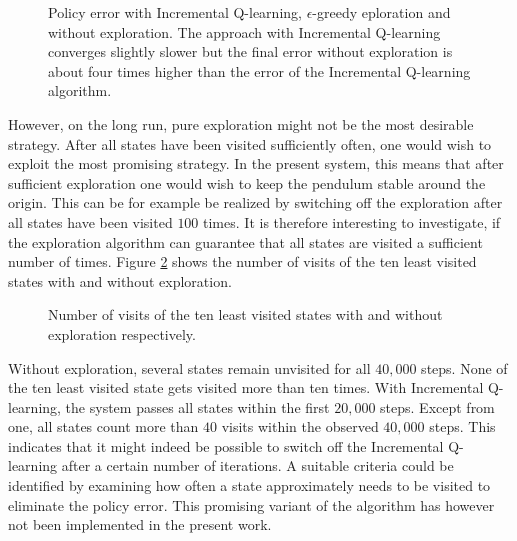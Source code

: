 \documentclass[../main.tex]{subfiles}
\begin{document}
\begin{figure}[h]
    \centering
    \caption{Policy error with Incremental Q-learning, $\epsilon$-greedy eploration and without exploration. The approach with Incremental Q-learning converges slightly slower but the final error without exploration is about four times higher than the error of the Incremental Q-learning algorithm.} \label{fig:PolicyError}
\end{figure}

However, on the long run, pure exploration might not be the most desirable strategy. After all states have been visited sufficiently often, one would wish to exploit the most promising strategy. In the present system, this means that after sufficient exploration one would wish to keep the pendulum stable around the origin. This can be for example be realized by switching off the exploration after all states have been visited $100$ times. It is therefore interesting to investigate, if the exploration algorithm can guarantee that all states are visited a sufficient number of times. Figure \ref{fig:leastvisited} shows the number of visits of the ten least visited states with and without exploration. 
\begin{figure}[h]
    \centering
        \caption{Number of visits of the ten least visited states with and without exploration respectively.}  \label{fig:leastvisited}
\end{figure}
Without exploration, several states remain unvisited for all $40,000$ steps. None of the ten least visited state gets visited more than ten times. With Incremental Q-learning, the system passes all states within the first $20,000$ steps. Except from one, all states count more than $40$ visits within the observed $40,000$ steps. This indicates that it might indeed be possible to switch off the Incremental Q-learning after a certain number of iterations. A suitable criteria could be identified by examining how often a state approximately needs to be visited to eliminate the policy error. This promising variant of the algorithm has however not been implemented in the present work.\par
\end{document}
